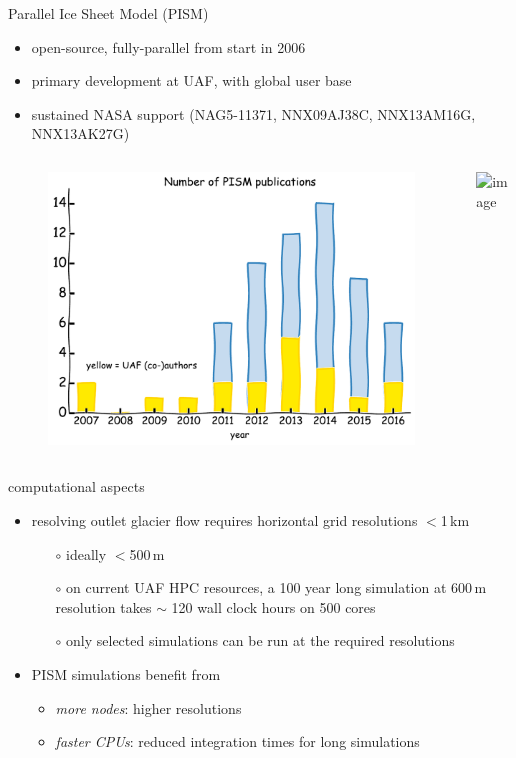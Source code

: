 \documentclass[hide notes,intlimits]{beamer}
\begin{document}
{
%
}


\begin{frame}{Parallel Ice Sheet Model (PISM)}
  \begin{itemize}
  \item open-source, fully-parallel from start in 2006
  \item primary development at UAF, with global user base
  \item sustained NASA support \tiny (NAG5-11371, NNX09AJ38C, NNX13AM16G, NNX13AK27G)
  \end{itemize}
  \begin{columns}
    \column[c]{4.75cm}
    \begin{figure}
      \includegraphics[width=\textwidth]{pism-uaf-publications}
    \end{figure}
    \column[c]{6.25cm}
    \includegraphics<1>[width=\textwidth]{pism-users}
  \end{columns}
\end{frame}


\begin{frame}{computational aspects}
  
  \begin{itemize}
  \item resolving outlet glacier flow requires horizontal grid resolutions $<$1\,km
       \begin{itemize}
       \item[$\circ$] ideally $<$500\,m
       \item[$\circ$] on current UAF HPC resources, a 100 year long simulation at 600\,m resolution takes $\sim$ 120 wall clock hours on 500 cores
       \item[$\circ$] only selected simulations can be run at the required resolutions
       \end{itemize}
  \item PISM simulations benefit from
    \begin{itemize}
    \item \emph{more nodes}: higher resolutions
    \item \emph{faster CPUs}: reduced integration times for long simulations
    \end{itemize}
\end{itemize}
\end{frame}
\end{document}
